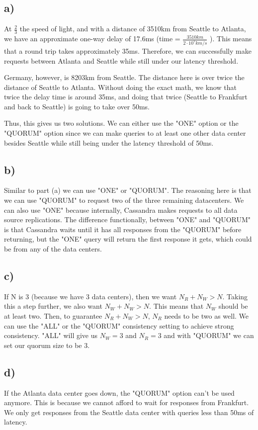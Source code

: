 \documentclass[12pt]{article}
\begin{document}
\subsection*{a)}
At $ \frac{2}{3} $ the speed of light, and with a distance of 3510km from Seattle to Atlanta, we have an approximate one-way delay of 17.6ms (time = $\frac{3510km}{2\cdot 10^5 km/s}$ ). This means that a round trip takes approximately 35ms. Therefore, we can successfully make requests between Atlanta and Seattle while still under our latency threshold.

Germany, however, is 8203km from Seattle. The distance here is over twice the distance of Seattle to Atlanta. Without doing the exact math, we know that twice the delay time is around 35ms, and doing that twice (Seattle to Frankfurt and back to Seattle) is going to take over 50ms.

Thus, this gives us two solutions. We can either use the "ONE" option or the "QUORUM" option since we can make queries to at least one other data center besides Seattle while still being under the latency threshold of 50ms.
\subsection*{b)}
Similar to part (a) we can use "ONE" or "QUORUM". The reasoning here is that we can use "QUORUM" to request two of the three remaining datacenters. We can also use "ONE" because internally, Cassandra makes requests to all data source replications. The difference functionally, between "ONE" and "QUORUM" is that Cassandra waits until it has all responses from the "QUORUM" before returning, but the "ONE" query will return the first response it gets, which could be from any of the data centers.
\subsection*{c)}
If N is 3 (because we have 3 data centers), then we want $N_R + N_W > N$. Taking this a step further, we also want $N_W + N_W > N$. This means that $N_W$ should be at least two. Then, to guarantee $N_R + N_W > N$, $N_R$ needs to be two as well.
We can use the "ALL" or the "QUORUM" consistency setting to achieve strong consistency. "ALL" will give us $N_W=3$ and $N_R=3$ and with "QUORUM" we can set our quorum size to be 3.
\subsection*{d)}
If the Atlanta data center goes down, the "QUORUM" option can't be used anymore. This is because we cannot afford to wait for responses from Frankfurt. We only get responses from the Seattle data center with queries less than 50ms of latency.
\end{document}
